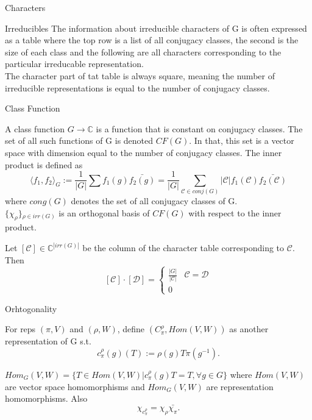 \documentclass[12pt, letterpaper]{article}
\newcommand{\C}{\mathbb{C}}
\begin{document}
\begin{section}{Characters}
\begin{subsection}{Irreducibles}
    The information about irreducible characters of G is often expressed as a
    table where the top row is a list of all conjugacy classes, the second is
    the size of each class and the following are all characters corresponding to
    the particular irreducable representation. \\
    The character part of tat table is always square, meaning the number of
    irreducible representations is equal to the number of conjugacy classes.

  \end{subsection}

  \begin{subsection}{Class Function}

    A class function \(G \to \C\) is a function that is constant on conjugacy
    classes. The set of all such functions of G is denoted \(CF(G)\). In that,
    this set is a vector space with dimension equal to the number of conjugacy
    classes. The inner product is defined as \[\langle f_{1}, f_{2} \rangle_{G}
      := \frac{1}{|G|} \sum f_{1}(g) \bar{f_{2}(g)} = \frac{1}{|G|}
      \sum_{\mathcal{C} \in conj(G)} |\mathcal{C}| f_{1}(\mathcal{C})
      \bar{f_{2}(\mathcal{C})}\] where \(cong(G)\) denotes the set of all
    conjugacy classes of G. \\
    \(\{\chi_{\rho}\}{}_{\rho \in irr(G)}\) is an
    orthogonal basis of \(CF(G)\) with respect to the inner product.

    Let \([\mathcal{C}] \in \C^{|irr(G)|}\) be the column of the character
    table corresponding to \(\mathcal{C}\).
    Then \[[\mathcal{C}] \cdot [\mathcal{D}] =
      \begin{cases}
        \frac{|G|}{|\mathcal{C}|} & \mathcal{C} = \mathcal{D} \\
        0
      \end{cases}\]

  \end{subsection}

  \begin{subsection}{Orhtogonality}

    For reps \((\pi, V)\) and \((\rho, W)\), define
    \((C^{\rho}_{\pi}, Hom(V, W))\) as another representation of G
    s.t.\ \[c^{\rho}_{\pi}(g)(T) := \rho(g)T\pi(g^{-1}).\]

    \(Hom_{G}(V, W) = \{T \in Hom(V, W) | c^{\rho}_{\pi}(g)T = T,
    \forall g \in G\}\) where \(Hom(V, W)\) are vector space homomorphisms and
    \(Hom_{G}(V, W)\) are representation homomorphisms.
    Also \[\chi_{c^{\rho}_{\pi}} = \chi_{\rho} \bar{\chi_{\pi}}.\]


\end{subsection}
\end{section}
\end{document}
